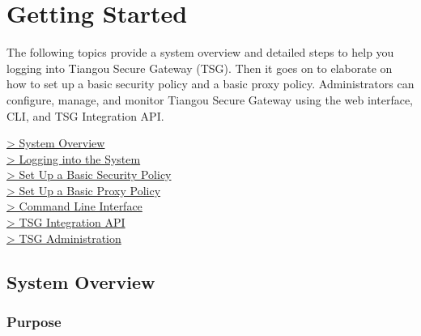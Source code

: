 
%
\chapter*{\hypertarget{link:Getting Started}{Getting Started}}
\label{sec:intro}


The following topics provide a system overview and detailed steps to help you logging into Tiangou Secure Gateway (TSG). 
Then it goes on to elaborate on how to set up a basic security policy and a basic proxy policy. 
Administrators can configure, manage, and monitor Tiangou Secure Gateway using the web interface, CLI, and TSG Integration API.

{
\color{linkblue}
\hyperlink{link:system overview}{> System Overview} \\
\hyperlink{link:Logging into the System}{> Logging into the System} \\
\hyperlink{link:Set Up a Basic Security Policy}{> Set Up a Basic Security Policy}\\
\hyperlink{link:Set Up a Basic Proxy Policy}{> Set Up a Basic Proxy Policy}\\
\hyperlink{link:Command Line Interface}{> Command Line Interface}\\
\hyperlink{link:TSG Integration API}{> TSG Integration API}\\
\hyperlink{link:TSG Administration}{> TSG Administration}\\
}
\clearpage

\section*{\hypertarget{link:system overview}{System Overview}}
\label{sec:intro:overview}

\subsection*{\hypertarget{link:Purpose}{Purpose}}
\label{sec:intro:overview:purpose}

